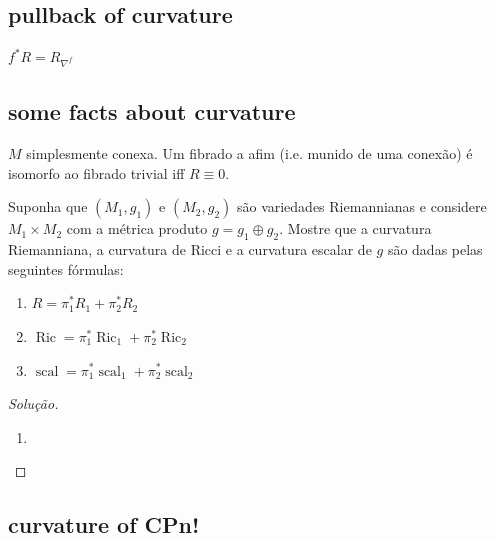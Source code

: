 \subsection{pullback of curvature}

\begin{exercise}\leavevmode
\(f^* R=R_{\nabla^f}\)
\end{exercise}

\subsection{some facts about curvature}

\begin{claim}\leavevmode
\(M\) simplesmente conexa. Um fibrado a afim (i.e. munido de uma conexão) é isomorfo ao fibrado trivial iff \(R \equiv 0\).
\end{claim}



\begin{exercise}\leavevmode
Suponha que \((M_1,g_1)\) e \((M_2,g_2)\) são variedades Riemannianas e considere \(M_1\times M_2\) com a métrica produto \(g=g_1 \oplus  g_2\). Mostre que a curvatura Riemanniana, a curvatura de Ricci e a curvatura escalar de \(g\) são dadas pelas seguintes fórmulas:
\begin{enumerate}[label=(\alph*)]
\item \(R=\pi_1^*R_1+\pi_2^*R_2\)
\item \(\operatorname{Ric}=\pi_1^*\operatorname{Ric}_1+\pi_2^*\operatorname{Ric}_2\)
\item \(\operatorname{scal}=\pi_1^*\operatorname{scal}_1+\pi_2^*\operatorname{scal}_2\)
\end{enumerate}
\end{exercise}

\begin{proof}[Solução]\leavevmode
\begin{enumerate}[label=(\alph*)]
\item 
\end{enumerate}
\end{proof}

\subsection{curvature of CPn!}

